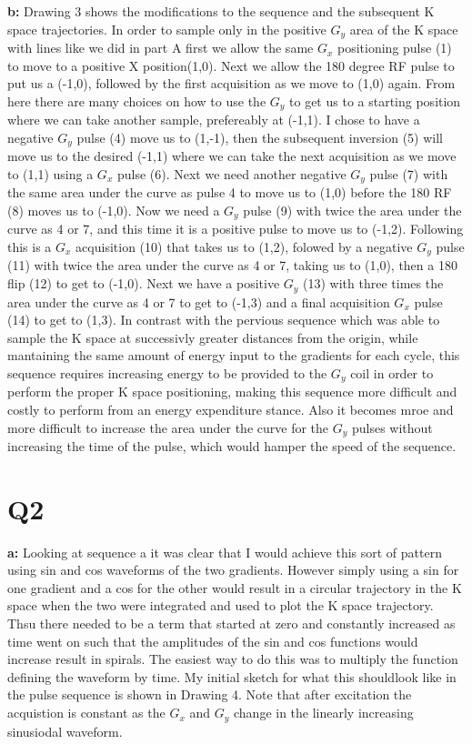 \documentclass[12pt]{article}
\begin{document}
\noindent\textbf{b: } Drawing 3 shows the modifications to the sequence and the subsequent K space trajectories. In order to sample only in the positive $G_y$ area of the K space with lines like we did in part A first we allow the same $G_x$ positioning pulse (1) to move to a positive X position(1,0). Next we allow the 180 degree RF pulse to put us a (-1,0), followed by the first acquisition as we move to (1,0) again. From here there are many choices on how to use the $G_y$ to get us to a starting position where we can take another sample, prefereably at (-1,1). I chose to have a negative $G_y$ pulse (4) move us to (1,-1), then the subsequent inversion (5) will move us to the desired (-1,1) where we can take the next acquisition as we move to (1,1) using a $G_x$ pulse (6). Next we need another negative $G_y$ pulse (7) with the same area under the curve as pulse 4 to move us to (1,0) before the 180 RF (8) moves us to (-1,0). Now we need a $G_y$ pulse (9) with twice the area under the curve as 4 or 7, and this time it is a positive pulse to move us to (-1,2). Following this is a $G_x$ acquisition (10) that takes us to (1,2), folowed by a negative $G_y$ pulse (11) with twice the area under the curve as 4 or 7, taking us to (1,0), then a 180 flip (12) to get to (-1,0). Next we have a positive $G_y$ (13) with three times the area under the curve as 4 or 7 to get to (-1,3) and a final acquisition $G_x$ pulse (14) to get to (1,3). In contrast with the pervious sequence which was able to sample the K space at successivly greater distances from the origin, while mantaining the same amount of energy input to the gradients for each cycle, this sequence requires increasing energy to be provided to the $G_y$ coil in order to perform the proper K space positioning, making this sequence more difficult and costly to perform from an energy expenditure stance. Also it becomes mroe and more difficult to increase the area under the curve for the $G_y$ pulses without increasing the time of the pulse, which would hamper the speed of the sequence.

\section{Q2}
\noindent\textbf{a: }
Looking at sequence a it was clear that I would achieve this sort of pattern using sin and cos waveforms of the two gradients.  However simply using a sin for one gradient and a cos for the other would result in a circular trajectory in the K space when the two were integrated and used to plot the K space trajectory. Thsu there needed to be a term that started at zero and constantly increased as time went on such that the amplitudes of the sin and cos functions would increase result in spirals. The easiest way to do this was to multiply the function defining the waveform by time. My initial sketch for what this shouldlook like in the pulse sequence is shown in Drawing  4. Note that after excitation the acquistion is constant as the $G_x$ and $G_y$ change in the linearly increasing sinusiodal waveform.
\end{document}
